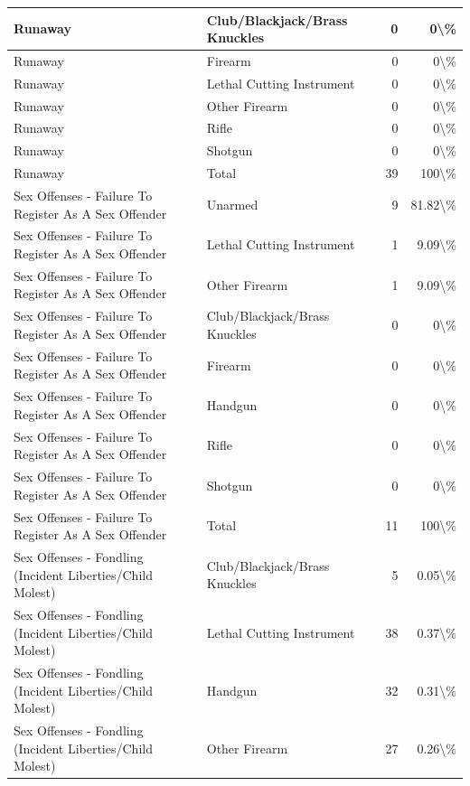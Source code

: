 \documentclass[
]{krantz}
\begin{document}
\begin{longtable}[t]{l|l|r|r}
\hline
Runaway & Club/Blackjack/Brass Knuckles & 0 & 0\textbackslash{}\%\\
\hline
Runaway & Firearm & 0 & 0\textbackslash{}\%\\
\hline
Runaway & Lethal Cutting Instrument & 0 & 0\textbackslash{}\%\\
\hline
Runaway & Other Firearm & 0 & 0\textbackslash{}\%\\
\hline
Runaway & Rifle & 0 & 0\textbackslash{}\%\\
\hline
Runaway & Shotgun & 0 & 0\textbackslash{}\%\\
\hline
Runaway & Total & 39 & 100\textbackslash{}\%\\
\hline
Sex Offenses - Failure To Register As A Sex Offender & Unarmed & 9 & 81.82\textbackslash{}\%\\
\hline
Sex Offenses - Failure To Register As A Sex Offender & Lethal Cutting Instrument & 1 & 9.09\textbackslash{}\%\\
\hline
Sex Offenses - Failure To Register As A Sex Offender & Other Firearm & 1 & 9.09\textbackslash{}\%\\
\hline
Sex Offenses - Failure To Register As A Sex Offender & Club/Blackjack/Brass Knuckles & 0 & 0\textbackslash{}\%\\
\hline
Sex Offenses - Failure To Register As A Sex Offender & Firearm & 0 & 0\textbackslash{}\%\\
\hline
Sex Offenses - Failure To Register As A Sex Offender & Handgun & 0 & 0\textbackslash{}\%\\
\hline
Sex Offenses - Failure To Register As A Sex Offender & Rifle & 0 & 0\textbackslash{}\%\\
\hline
Sex Offenses - Failure To Register As A Sex Offender & Shotgun & 0 & 0\textbackslash{}\%\\
\hline
Sex Offenses - Failure To Register As A Sex Offender & Total & 11 & 100\textbackslash{}\%\\
\hline
Sex Offenses - Fondling (Incident Liberties/Child Molest) & Club/Blackjack/Brass Knuckles & 5 & 0.05\textbackslash{}\%\\
\hline
Sex Offenses - Fondling (Incident Liberties/Child Molest) & Lethal Cutting Instrument & 38 & 0.37\textbackslash{}\%\\
\hline
Sex Offenses - Fondling (Incident Liberties/Child Molest) & Handgun & 32 & 0.31\textbackslash{}\%\\
\hline
Sex Offenses - Fondling (Incident Liberties/Child Molest) & Other Firearm & 27 & 0.26\textbackslash{}\%\\

\end{longtable}
\end{document}
